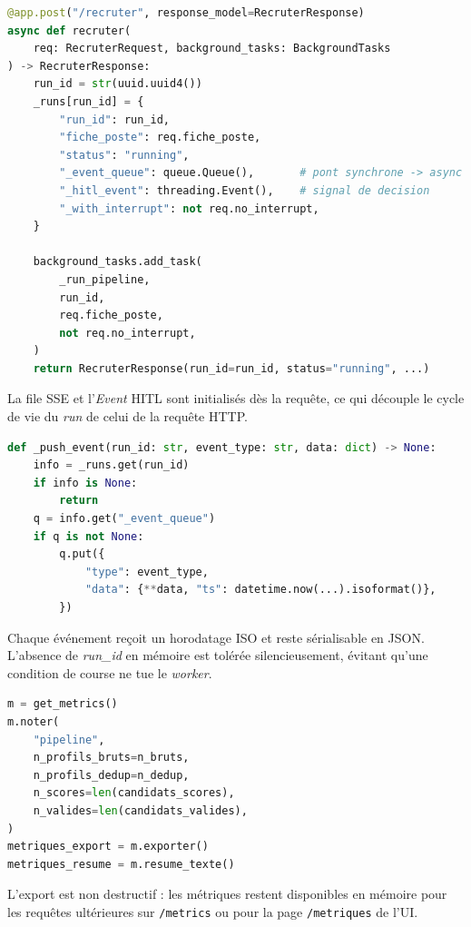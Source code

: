 \begin{lstlisting}[language=Python,caption={Initialisation d'un \textit{run} et lancement en arrière-plan (\texttt{src/api.py})}]
@app.post("/recruter", response_model=RecruterResponse)
async def recruter(
    req: RecruterRequest, background_tasks: BackgroundTasks
) -> RecruterResponse:
    run_id = str(uuid.uuid4())
    _runs[run_id] = {
        "run_id": run_id,
        "fiche_poste": req.fiche_poste,
        "status": "running",
        "_event_queue": queue.Queue(),       # pont synchrone -> async
        "_hitl_event": threading.Event(),    # signal de decision
        "_with_interrupt": not req.no_interrupt,
    }

    background_tasks.add_task(
        _run_pipeline,
        run_id,
        req.fiche_poste,
        not req.no_interrupt,
    )
    return RecruterResponse(run_id=run_id, status="running", ...)
\end{lstlisting}

La file SSE et l'\textit{Event} HITL sont initialisés dès la requête, ce qui découple le cycle de vie du \textit{run} de celui de la requête HTTP.

\begin{lstlisting}[language=Python,caption={Capture d'événements dans la file SSE (\texttt{src/api.py})}]
def _push_event(run_id: str, event_type: str, data: dict) -> None:
    info = _runs.get(run_id)
    if info is None:
        return
    q = info.get("_event_queue")
    if q is not None:
        q.put({
            "type": event_type,
            "data": {**data, "ts": datetime.now(...).isoformat()},
        })
\end{lstlisting}

Chaque événement reçoit un horodatage ISO et reste sérialisable en JSON. L'absence de \textit{run\_id} en mémoire est tolérée silencieusement, évitant qu'une condition de course ne tue le \textit{worker}.

\begin{lstlisting}[language=Python,caption={Export des métriques en fin de pipeline (\texttt{src/agents/orchestrateur.py})}]
m = get_metrics()
m.noter(
    "pipeline",
    n_profils_bruts=n_bruts,
    n_profils_dedup=n_dedup,
    n_scores=len(candidats_scores),
    n_valides=len(candidats_valides),
)
metriques_export = m.exporter()
metriques_resume = m.resume_texte()
\end{lstlisting}

L'export est non destructif : les métriques restent disponibles en mémoire pour les requêtes ultérieures sur \texttt{/metrics} ou pour la page \texttt{/metriques} de l'UI.
